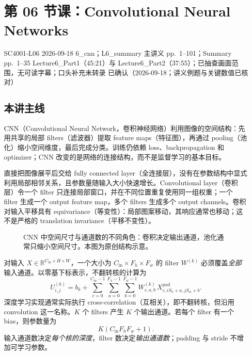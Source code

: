 
\section{第 06 节课：Convolutional Neural Networks}
\label{lecture:SC4001-L06}

\lecturemeta
  {SC4001-L06}
  {2026-09-18}
  {6\_cnn；L6\_summary}
  {主讲义 pp.~1--101；Summary pp.~1--35}
  {Lecture6\_Part1（45:21）与 Lecture6\_Part2（37:55）；已抽查画面范围，无可读字幕；口头补充未转录}
  {已确认（2026-09-18；讲义例题与关键数值已核对）}

\subsection{本讲主线}

CNN（Convolutional Neural Network，卷积神经网络）利用图像的空间结构：先用共享的局部 filters（滤波器）提取 feature maps（特征图），再通过 pooling（池化）缩小空间维度，最后完成分类。训练仍依赖 loss、backpropagation 和 optimizer；CNN 改变的是网络的连接结构，而不是监督学习的基本目标。


直接把图像展平后交给 fully connected layer（全连接层），没有在参数结构中显式利用局部相邻关系，且参数量随输入大小快速增长。Convolutional layer（卷积层）令一个 filter 只连接局部窗口，并在不同位置重复使用同一组权重；一个 filter 生成一个 output feature map，多个 filters 生成多个 output channels。卷积对输入平移具有 equivariance（等变性）：局部图案移动，其响应通常也移动；这不是严格的 translation invariance（平移不变性）。

\begin{figure}[htbp]
  \centering
  \resizebox{0.96\textwidth}{!}{}
  \caption{CNN 中空间尺寸与通道数的不同角色：卷积决定输出通道，池化通常只缩小空间尺寸。本图为原创结构示意。}
  \label{fig:sc4001-l06-pipeline}
\end{figure}


对输入 $X\in\mathbb R^{C_{\mathrm{in}}\times H\times W}$，一个大小为 $C_{\mathrm{in}}\times F_h\times F_w$ 的 filter $W^{(k)}$ 必须覆盖\emph{全部}输入通道。以零基下标表示，不翻转核的计算为
\[
  U^{(k)}_{i,j}=b_k+
  \sum_{c=0}^{C_{\mathrm{in}}-1}
  \sum_{a=0}^{F_h-1}\sum_{b=0}^{F_w-1}
  W^{(k)}_{c,a,b}\,X^{\mathrm{pad}}_{c,iS_h+a,jS_w+b}.
\]
深度学习实现通常实际执行 cross-correlation（互相关），即不翻转核，但沿用 convolution 这一名称。$K$ 个 filters 产生 $K$ 个输出通道。若每个 filter 有一个 bias，则参数量为
\[
  \boxed{K(C_{\mathrm{in}}F_hF_w+1)}.
\]
输入通道数决定\emph{每个核的深度}，filter 数决定\emph{输出通道数}；padding 与 stride 不增加可学习参数。

